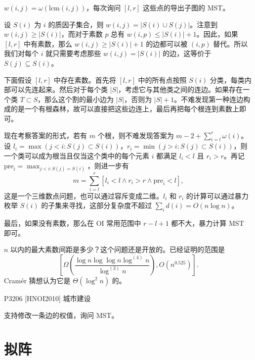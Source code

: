 \begin{exercise}
    $w(i,j)=\omega(\mathrm{lcm}(i,j))$，每次询问 $[l,r]$ 这些点的导出子图的 MST。
\end{exercise}
\begin{solution}
    设 $S(i)$ 为 $i$ 的质因子集合，则 $w(i,j)=|S(i)\cup S(j)|$。注意到 $w(i,j)\ge |S(i)|$，而对于素数 $p$ 总有 $w(i,p)\le |S(i)|+1$。因此，如果 $[l,r]$ 中有素数，那么 $w(i,j)\ge |S(i)|+1$ 的边都可以被 $(i,p)$ 替代。所以我们对每个 $i$ 就只需要考虑那些 $w(i,j)=|S(i)|$ 的边，这等价于 $S(j)\subseteq S(i)$。

    下面假设 $[l,r]$ 中存在素数。首先将 $[l,r]$ 中的所有点按照 $S(i)$ 分类，每类内部可以先连起来。然后对于每个类 $|S|$，考虑它与其他类之间的连边。如果存在一个类 $T\subset S$，那么这个割的最小边为 $|S|$，否则为 $|S|+1$。不难发现第一种连边构成的是一个有根森林，故可以直接把这些边连上，最后再把每个根连到素数上即可。

    现在考察答案的形式，若有 $m$ 个根，则不难发现答案为 $m-2+\sum_{i=l}^r \omega(i)$。设 $l_i=\max(j<i:S(j)\subset S(i))$，$r_i=\min(j>i:S(j)\subset S(i))$，则一个类可以成为根当且仅当这个类中的每个元素 $i$ 都满足 $l_i<l$ 且 $r_i>r$。再记 $\mathrm{pre}_i=\max_{j<i:S(j)=S(i)}$，则进一步有
    $$
    m=\sum_{i=l}^r [l_i<l\land  r_i>r \land \mathrm{pre}_i<l],
    $$ 
    这是一个三维数点问题，也可以通过容斥变成二维。$l_i$ 和 $r_i$ 的计算可以通过暴力枚举 $S(i)$ 的子集来寻找，这部分复杂度不超过 $\sum_i d(i)=O(n\log n)$。
    
    最后，如果没有素数，那么在 OI 常用范围中 $r-l+1$ 都不大，暴力计算 MST 即可。
\end{solution}
\begin{remark}
    $n$ 以内的最大素数间距是多少？这个问题还是开放的。已经证明的范围是 
    $$
    \left[\Omega\left(\frac{\log n\log\log n\log^{(4)}n}{\log^{(3)}n}\right),O(n^{0.525})\right].
    $$
    Cramér 猜想认为它是 $\Theta(\log^2 n)$ 的。
\end{remark}

\begin{example}
    P3206 [HNOI2010] 城市建设

    支持修改一条边的权值，询问 MST。
\end{example}


\section{拟阵}\label{sec: matroid}




